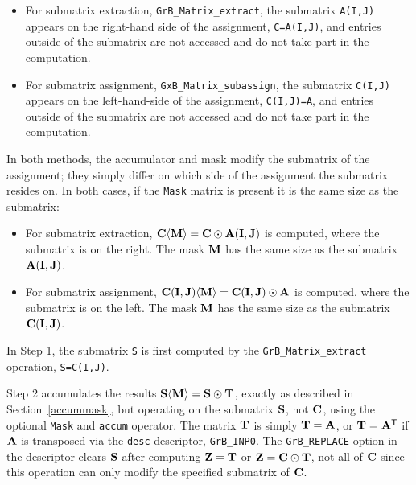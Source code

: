 \documentclass[12pt]{article}
\begin{document}
{\begin{itemize}
\item
For submatrix extraction, \verb'GrB_Matrix_extract',
the submatrix \verb'A(I,J)' appears on the right-hand side of the assignment,
\verb'C=A(I,J)', and entries outside of the submatrix are not accessed and do
not take part in the computation.

\item
For submatrix assignment, \verb'GxB_Matrix_subassign',
the submatrix \verb'C(I,J)' appears on the left-hand-side of the assignment,
\verb'C(I,J)=A', and entries outside of the submatrix are not accessed and do
not take part in the computation.

\end{itemize}

In both methods, the accumulator and mask modify the submatrix of the
assignment; they simply differ on which side of the assignment the submatrix
resides on.  In both cases, if the \verb'Mask' matrix is present it is the same
size as the submatrix:

\begin{itemize}

\item
For submatrix extraction,
${\bf C \langle M \rangle = C \odot A(I,J)}$ is computed,
where the submatrix is on the right.
The mask ${\bf M}$ has the same size as the submatrix ${\bf A(I,J)}$.

\item
For submatrix assignment,
${\bf C(I,J) \langle M \rangle = C(I,J) \odot A}$ is computed,
where the submatrix is on the left.
The mask ${\bf M}$ has the same size as the submatrix ${\bf C(I,J)}$.

\end{itemize}

In Step 1, the submatrix \verb'S' is first computed by the
\verb'GrB_Matrix_extract' operation, \verb'S=C(I,J)'.

Step 2 accumulates the results ${\bf S \langle M \rangle  = S \odot T}$,
exactly as described in Section~\ref{accummask}, but operating on the submatrix
${\bf S}$, not ${\bf C}$, using the optional \verb'Mask' and \verb'accum'
operator.  The matrix ${\bf T}$ is simply ${\bf T}={\bf A}$, or ${\bf T}={\bf
A}^{\sf T}$ if ${\bf A}$ is transposed via the \verb'desc' descriptor,
\verb'GrB_INP0'.  The \verb'GrB_REPLACE' option in the descriptor clears ${\bf
S}$ after computing ${\bf Z = T}$ or ${\bf Z = C \odot T}$, not all of ${\bf
C}$ since this operation can only modify the specified submatrix of ${\bf C}$.

}
\end{document}
